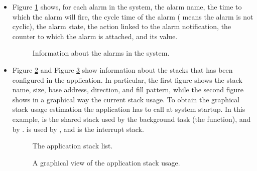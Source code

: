 \begin{itemize}
\item Figure \ref{fig:trace32_alarm} shows, for each alarm in the
  system, the alarm name, the time to which the alarm will fire, the
  cycle time of the alarm ( means the alarm is not cyclic),
  the alarm state, the action linked to the alarm notification, the
  counter to which the alarm is attached, and its value.
%
\begin{figure}
\caption{\label{fig:trace32_alarm} Information about the alarms in the
system.}
\end{figure}
%

\item Figure \ref{fig:trace32_stack} and Figure
  \ref{fig:trace32_stackview} show information about the stacks that
  has been configured in the application. In particular, the first
  figure shows the stack name, size, base address, direction, and fill
  pattern, while the second figure shows in a graphical way the
  current stack usage. To obtain the graphical stack usage estimation
  the application has to call  at system
  startup. In this example,  is the shared stack used by
  the background task (the  function), and by
  .  is used by , and  is
  the interrupt stack.
%
\begin{figure}
\caption{\label{fig:trace32_stack} The application stack list.}
\end{figure}
%
\begin{figure}
\caption{\label{fig:trace32_stackview} A graphical view of the
application stack usage.}
\end{figure}



\end{itemize}
